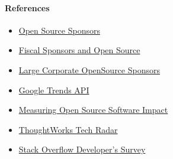 \hypertarget{references}{%
\paragraph{References}\label{references}}

\begin{itemize}
\tightlist
\item
  \href{https://opensource.org/sponsors}{Open Source Sponsors}
\item
  \href{https://opensource.com/article/19/1/fiscal-sponsors-open-source}{Fiscal
  Sponsors and Open Source}
\item
  \href{https://www.networkworld.com/article/2867020/big-names-like-google-dominate-open-source-funding.html}{Large
  Corporate OpenSource Sponsors}
\item
  \href{https://www.npmjs.com/package/google-trends-api}{Google Trends
  API}
\item
  \href{https://aisel.aisnet.org/cgi/viewcontent.cgi?article=1496\&context=amcis2018}{Measuring
  Open Source Software Impact}
\item
  \href{https://www.thoughtworks.com/radar}{ThoughtWorks Tech Radar}
\item
  \href{https://insights.stackoverflow.com/survey/2019\#technology}{Stack
  Overflow Developer's Survey}
\end{itemize}
